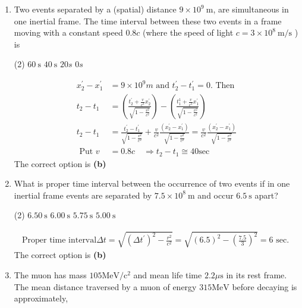 \begin{enumerate}
	\item Two events separated by a (spatial) distance $9 \times 10^{9} \mathrm{~m}$, are simultaneous in one inertial frame. The time interval between these two events in a frame moving with a constant speed $0.8 c$ (where the speed of light $c=3 \times 10^{8} \mathrm{~m} / \mathrm{s}$ ) is
	{}
\begin{tasks}(2)
	\task[\textbf{A.}] $60 \mathrm{~s}$
	\task[\textbf{B.}]$40 \mathrm{~s}$
	\task[\textbf{C.}]$20 s$
	\task[\textbf{D.}] $0 s$
\end{tasks}
\begin{answer}
	\begin{align*}
	x_{2}^{\prime}-x_{1}^{\prime}&=9 \times 10^{9} m \text { and } t_{2}^{\prime}-t_{1}^{\prime}=0 . \text { Then }\\
	t_{2}-t_{1}&=\left(\frac{t_{2}^{\prime}+\frac{v}{c^{2}} x_{2}^{\prime}}{\sqrt{1-\frac{v^{2}}{c^{2}}}}\right)-\left(\frac{t_{1}^{1}+\frac{v}{c^{2}} x_{1}^{\prime}}{\sqrt{1-\frac{v^{2}}{c^{2}}}}\right)\\
	t_{2}-t_{1}&=\frac{t_{2}^{\prime}-t_{1}^{\prime}}{\sqrt{1-\frac{v^{2}}{c^{2}}}}+\frac{v}{c^{2}} \frac{\left(x_{2}^{\prime}-x_{1}^{\prime}\right)}{\sqrt{1-\frac{v^{2}}{c^{2}}}}=\frac{v}{c^{2}} \frac{\left(x_{2}^{\prime}-x_{1}^{\prime}\right)}{\sqrt{1-\frac{v^{2}}{c^{2}}}}\\
	\text { Put } v&=0.8 c \quad \Rightarrow t_{2}-t_{1} \cong 40 \mathrm{sec}
	\end{align*}
	The correct option is \textbf{(b)}
\end{answer}

	\item What is proper time interval between the occurrence of two events if in one inertial frame events are separated by $7.5 \times 10^{8} \mathrm{~m}$ and occur $6.5 \mathrm{~s}$ apart?
	{}
\begin{tasks}(2)
	\task[\textbf{A.}] $6.50 \mathrm{~s}$
	\task[\textbf{B.}]$6.00 \mathrm{~s}$
	\task[\textbf{C.}]$5.75 \mathrm{~s}$
	\task[\textbf{D.}]$5.00 \mathrm{~s}$
\end{tasks}
\begin{answer}
	\begin{align*}
	\text{Proper time interval}
	\Delta t=\sqrt{\left(\Delta t^{\prime}\right)^{2}-\frac{r^{2}}{c^{2}}}=\sqrt{(6.5)^{2}-\left(\frac{7.5}{3}\right)^{2}}=6 \text { sec. }
	\end{align*}
	The correct option is \textbf{(b)}
\end{answer}
	\item The muon has mass $105 \mathrm{MeV} / \mathrm{c}^{2}$ and mean life time $2.2 \mu \mathrm{s}$ in its rest frame. The mean distance traversed by a muon of energy $315 \mathrm{MeV}$ before decaying is approximately,
	{}


\end{enumerate}
